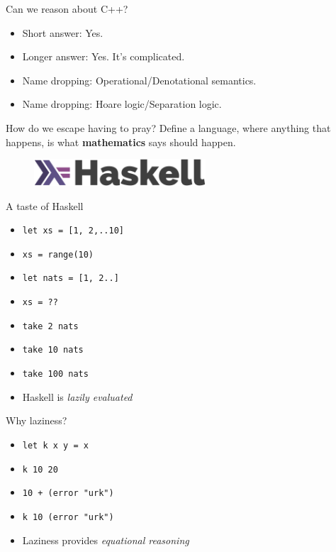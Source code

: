 \documentclass[8pt]{beamer}
\newcommand{\py}[1]{\texttt{#1}}
\newcommand{\hs}[1]{\texttt{#1}}
\begin{document}
\begin{frame}[fragile]{Can we reason about C++?}
    \pause
    \begin{itemize}
    \item Short answer: Yes. \pause
    \item Longer answer: Yes. It's complicated. \pause
    \item Name dropping: Operational/Denotational semantics. \pause
    \item Name dropping: Hoare logic/Separation logic. \pause
    \end{itemize}
\end{frame}


\begin{frame}[fragile]{How do we escape having to pray?}
    \pause
    Define a language, \pause where anything that happens, \pause is what \textbf{mathematics} says should happen.
    \pause

\begin{figure}
\includegraphics[height=1cm]{./haskell-logo.png}
\end{figure}
\end{frame}

\begin{frame}[fragile]{A taste of Haskell}
    \begin{itemize}
        \item \hs{let xs = [1, 2,..10]} \pause
        \item \py{xs = range(10)} \pause
        \item \hs{let nats = [1, 2..]} \pause
        \item \py{xs = ??} \pause
        \item \hs{take 2 nats} \pause
        \item \hs{take 10 nats} \pause
        \item \hs{take 100 nats} \pause
        \item Haskell is \emph{lazily evaluated} \pause
    \end{itemize}
\end{frame}

\begin{frame}[fragile]{Why laziness?}
    \begin{itemize}
        \item \hs{let k x y = x} \pause
        \item \hs{k 10 20} \pause
        \item \hs{10 + (error "urk")} \pause
        \item \hs{k 10 (error "urk")} \pause
        \item Laziness provides \emph{equational reasoning}
    \end{itemize}
\end{frame}
\end{document}
